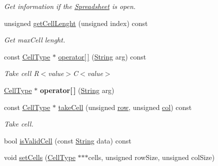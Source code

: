 \begin{DoxyCompactItemize}
\begin{DoxyCompactList}\small\item\em Get information if the \hyperlink{class_spreadsheet}{Spreadsheet} is open. \end{DoxyCompactList}\item 
\mbox{\label{class_spreadsheet_aa46282ef1877328ccc2626791dbc7cdf}} 
unsigned \hyperlink{class_spreadsheet_aa46282ef1877328ccc2626791dbc7cdf}{get\+Cell\+Lenght} (unsigned index) const
\begin{DoxyCompactList}\small\item\em Get max\+Cell lenght. \end{DoxyCompactList}\item 
\mbox{\label{class_spreadsheet_a6d920dbf2f30f6c69955fd0d1a3980db}} 
const \hyperlink{class_cell_type}{Cell\+Type} $\ast$ \hyperlink{class_spreadsheet_a6d920dbf2f30f6c69955fd0d1a3980db}{operator\mbox{[}$\,$\mbox{]}} (\hyperlink{class_string}{String} arg) const
\begin{DoxyCompactList}\small\item\em Take cell R$<$value$>$C$<$value$>$ \end{DoxyCompactList}\item 
\mbox{\label{class_spreadsheet_a85df209927f0e389fdb0a4528c62a29f}} 
\hyperlink{class_cell_type}{Cell\+Type} $\ast$ {\bfseries operator\mbox{[}$\,$\mbox{]}} (\hyperlink{class_string}{String} arg)
\item 
\mbox{\label{class_spreadsheet_ad0befef369800a0f0f4b631c8ff96769}} 
const \hyperlink{class_cell_type}{Cell\+Type} $\ast$ \hyperlink{class_spreadsheet_ad0befef369800a0f0f4b631c8ff96769}{take\+Cell} (unsigned \hyperlink{class_spreadsheet_ac2cd7c97b5d73805edcd14891d910f51}{row}, unsigned \hyperlink{class_spreadsheet_abee8b54fceb0f2c4314bbaf624feed75}{col}) const
\begin{DoxyCompactList}\small\item\em Take cell. \end{DoxyCompactList}\item 
bool \hyperlink{class_spreadsheet_a541ce5ddde2c929e67230042434f4d07}{is\+Valid\+Cell} (const \hyperlink{class_string}{String} data) const
\item 
void \hyperlink{class_spreadsheet_a8183b9507cf53567b831352f27350688}{set\+Cells} (\hyperlink{class_cell_type}{Cell\+Type} $\ast$$\ast$$\ast$cells, unsigned row\+Size, unsigned col\+Size)

\end{DoxyCompactItemize}
